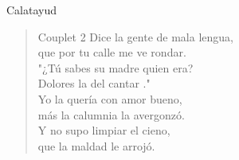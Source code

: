 \begin{song}{Calatayud}
\begin{verse}{Couplet 2}
Dice la gente de mala lengua,\\
que por tu calle me ve rondar.\hspace{1.5em}\\
"¿Tú sabes su madre quien era?\\
Dolores la del cantar ."\\
Yo la quería con amor bueno,\\
más la calumnia la avergonzó.\\
Y no supo\hspace{0.5em}\hspace{0.5em} limpiar el cieno,\\
que la maldad le arrojó.\\
\end{verse}
\end{song}
